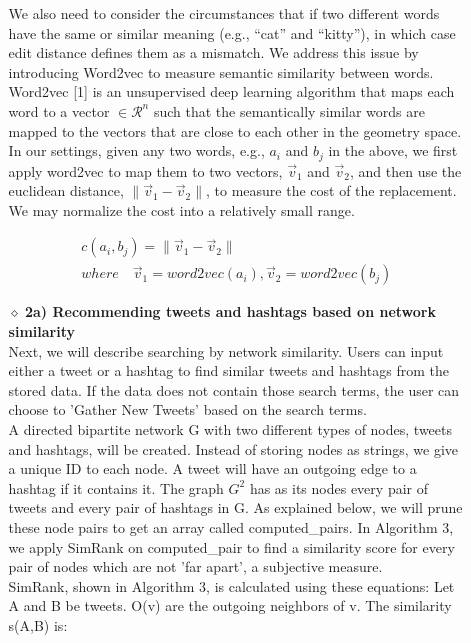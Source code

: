 \documentclass[10pt]{article}
\begin{document}
\begin{itemize}
\begin{itemize}
We also need to consider the circumstances that if two different words have the same or similar meaning (e.g., “cat” and “kitty”), in which case edit distance defines them as a mismatch. We address this issue by introducing Word2vec to measure semantic similarity between words. 
Word2vec [1] is an unsupervised  deep learning algorithm that maps each word to a vector  $\in \mathcal{R}^n$ such that the semantically similar words are mapped to the vectors that are close to each other in the geometry space. 
In our settings, given any two words, e.g.,  $a_i$ and $b_j$ in the above, we first apply word2vec to map them to two vectors, $\vec{v}_1$ and $\vec{v}_2$, and then use the euclidean distance, $\lVert \vec{v}_1 - \vec{v}_2 \rVert$, to measure the cost of the replacement.
We may normalize the cost into a relatively small range. 

$$
\begin{array}{c}
c(a_i, b_j)=\lVert \vec{v}_1 - \vec{v}_2 \rVert \\
 where \quad  \vec{v}_1 = word2vec(a_i), \vec{v}_2=word2vec(b_j)
\end{array}
$$

\item[$\diamond$]{\bf 2a) Recommending tweets and hashtags based on network similarity}\\

Next, we will describe searching by network similarity. Users can input either a tweet or a hashtag to find similar tweets and hashtags from the stored data. If the data does not contain those search terms, the user can choose to 'Gather New Tweets' based on
the search terms. \\

A directed bipartite network G with two different types of nodes, tweets and hashtags, will be created. Instead of storing nodes as strings, we give a unique ID to each node. A tweet will have an outgoing edge to a hashtag if it contains it. The graph $ G^2$ has as its nodes every pair of tweets and every pair of hashtags in G. As explained below, we will prune these node pairs to get an array called computed\_pairs. In Algorithm 3, we apply SimRank on computed\_pair  to find a similarity score for every pair of nodes which are not 'far apart', a subjective measure. \\

SimRank, shown in Algorithm 3, is calculated using these equations: Let A and B be tweets. O(v) are the outgoing neighbors of v. The similarity s(A,B) is:


\end{itemize}
\end{itemize}
\end{document}
